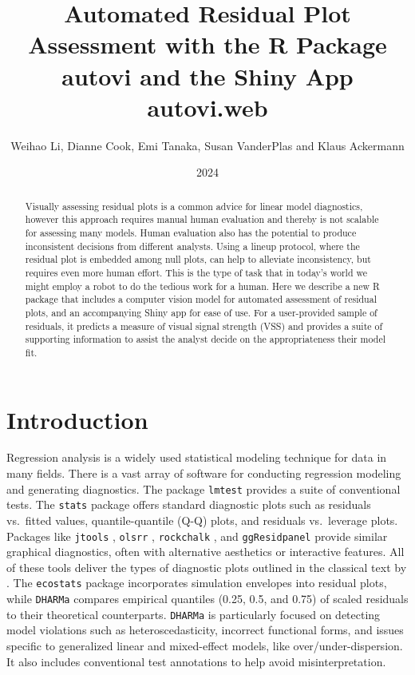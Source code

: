 \documentclass[
doublespace,
  times]{anzsauth}
\title{Automated Residual Plot Assessment with the R Package autovi and
the Shiny App autovi.web}
\author{
Weihao Li\addressnum{1},
Dianne Cook\addressnum{1},
Emi Tanaka\addressnum{2},
Susan VanderPlas\addressnum{3} and
Klaus Ackermann\addressnum{1}
}
\affiliation{
Monash University,
The Australian National University and
University of Nebraska
}
\date{2024}
\begin{document}
\begin{abstract}
Visually assessing residual plots is a common advice for linear model
diagnostics, however this approach requires manual human evaluation and
thereby is not scalable for assessing many models. Human evaluation also
has the potential to produce inconsistent decisions from different
analysts. Using a lineup protocol, where the residual plot is embedded
among null plots, can help to alleviate inconsistency, but requires even
more human effort. This is the type of task that in today's world we
might employ a robot to do the tedious work for a human. Here we
describe a new R package that includes a computer vision model for
automated assessment of residual plots, and an accompanying Shiny app
for ease of use. For a user-provided sample of residuals, it predicts a
measure of visual signal strength (VSS) and provides a suite of
supporting information to assist the analyst decide on the
appropriateness their model fit.
\end{abstract}

          

\maketitle


\section{Introduction}\label{sec-autovi-introduction}

Regression analysis is a widely used statistical modeling technique for
data in many fields. There is a vast array of software for conducting
regression modeling and generating diagnostics. The package
\texttt{lmtest} \citep{lmtest} provides a suite of conventional tests.
The \texttt{stats} package \citep{stats} offers standard diagnostic
plots such as residuals vs.~fitted values, quantile-quantile (Q-Q)
plots, and residuals vs.~leverage plots. Packages like \texttt{jtools}
\citep{jtools}, \texttt{olsrr} \citep{olsrr}, \texttt{rockchalk}
\citep{rockchalk}, and \texttt{ggResidpanel} \citep{ggresidpanel}
provide similar graphical diagnostics, often with alternative aesthetics
or interactive features. All of these tools deliver the types of
diagnostic plots outlined in the classical text by
\citet{cook1982residuals}. The \texttt{ecostats} package
\citep{warton_global_2023} incorporates simulation envelopes into
residual plots, while \texttt{DHARMa} \citep{dharma} compares empirical
quantiles (0.25, 0.5, and 0.75) of scaled residuals to their theoretical
counterparts. \texttt{DHARMa} is particularly focused on detecting model
violations such as heteroscedasticity, incorrect functional forms, and
issues specific to generalized linear and mixed-effect models, like
over/under-dispersion. It also includes conventional test annotations to
help avoid misinterpretation.
\end{document}
